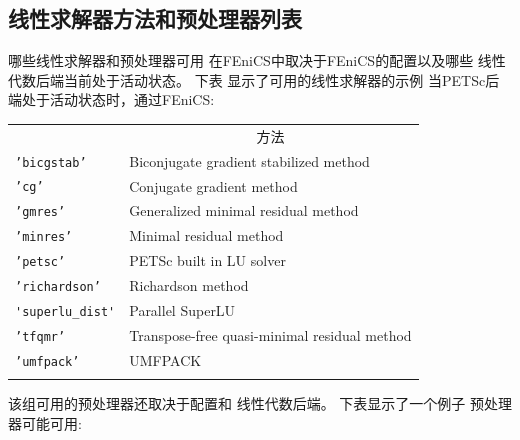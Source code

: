 \subsection{线性求解器方法和预处理器列表}
\label{ftut:app:solver:prec}


哪些线性求解器和预处理器可用
在FEniCS中取决于FEniCS的配置以及哪些
线性代数后端当前处于活动状态。 下表
显示了可用的线性求解器的示例
当PETSc后端处于活动状态时，通过FEniCS:

{\small

\vspace{4mm}

\begin{tabular}{ll}
\hline\noalign{\smallskip}
\multicolumn{1}{c}{ 名称 } & \multicolumn{1}{c}{ 方法 } \\
\noalign{\smallskip}\hline\noalign{\smallskip}
\texttt{'bicgstab'}     & Biconjugate gradient stabilized method       \\
\texttt{'cg'}           & Conjugate gradient method                    \\
\texttt{'gmres'}        & Generalized minimal residual method          \\
\texttt{'minres'}       & Minimal residual method                      \\
\texttt{'petsc'}        & PETSc built in LU solver                     \\
\texttt{'richardson'}   & Richardson method                            \\
\verb!'superlu_dist'! & Parallel SuperLU                             \\
\texttt{'tfqmr'}        & Transpose-free quasi-minimal residual method \\
\texttt{'umfpack'}      & UMFPACK                                      \\
\noalign{\smallskip}\hline\noalign{\smallskip}
\end{tabular}

\vspace{4mm}

}

\noindent
该组可用的预处理器还取决于配置和
线性代数后端。 下表显示了一个例子
预处理器可能可用:

